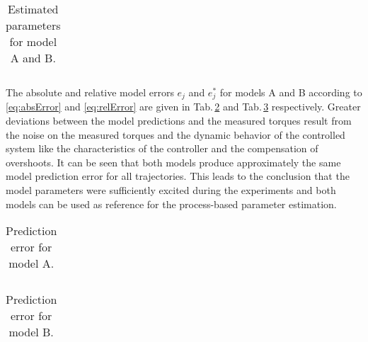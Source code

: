 \begin{table}
	\caption{Estimated parameters for model A and B.}\label{tab:ParamTheta}
	\vspace{-0.2cm}
	\centering
	\begin{tabular}[h]{|r||c|c||c|c|}\hline
		
		\hline
	\end{tabular}
\end{table}

The absolute and relative model errors $e_{j}$ and $e^*_{j}$ for models A and B according to \eqref{eq:absError} and \eqref{eq:relError} are given in Tab.\,\ref{tab:errorModelA} and Tab.\,\ref{tab:errorModelB} respectively. Greater deviations between the model predictions and the measured torques result from the noise on the measured torques and the dynamic behavior of the controlled system like the characteristics of the controller and the compensation of overshoots. It can be seen that both models produce approximately the same model prediction error for all trajectories. This leads to the conclusion that the model parameters were sufficiently excited during the experiments and both models can be used as reference for the process-based parameter estimation.

\begin{table}
	\caption{Prediction error for model A.}\label{tab:errorModelA}
	\centering
	\vspace{-0.2cm}
	\begin{tabular}[h]{|r||c|c||c|c|}\hline
		
		\hline
	\end{tabular}
\end{table}

\begin{table}
	\caption{Prediction error for model B.}\label{tab:errorModelB}
	\vspace{-0.2cm}
	\centering
	\begin{tabular}[h]{|r||c|c||c|c|}\hline
		
		\hline
	\end{tabular}
\end{table}
